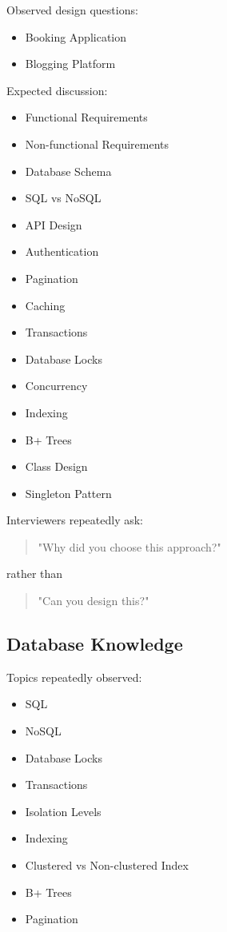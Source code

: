 \documentclass[11pt,a4paper]{article}
\begin{document}
Observed design questions:

\begin{itemize}
	\item Booking Application
	\item Blogging Platform
\end{itemize}

Expected discussion:

\begin{itemize}
	\item Functional Requirements
	\item Non-functional Requirements
	\item Database Schema
	\item SQL vs NoSQL
	\item API Design
	\item Authentication
	\item Pagination
	\item Caching
	\item Transactions
	\item Database Locks
	\item Concurrency
	\item Indexing
	\item B+ Trees
	\item Class Design
	\item Singleton Pattern
\end{itemize}

Interviewers repeatedly ask:

\begin{quote}
	"Why did you choose this approach?"
\end{quote}

rather than

\begin{quote}
	"Can you design this?"
\end{quote}


\subsection{Database Knowledge}

Topics repeatedly observed:

\begin{itemize}
	\item SQL
	\item NoSQL
	\item Database Locks
	\item Transactions
	\item Isolation Levels
	\item Indexing
	\item Clustered vs Non-clustered Index
	\item B+ Trees
	\item Pagination
\end{itemize}
\end{document}
